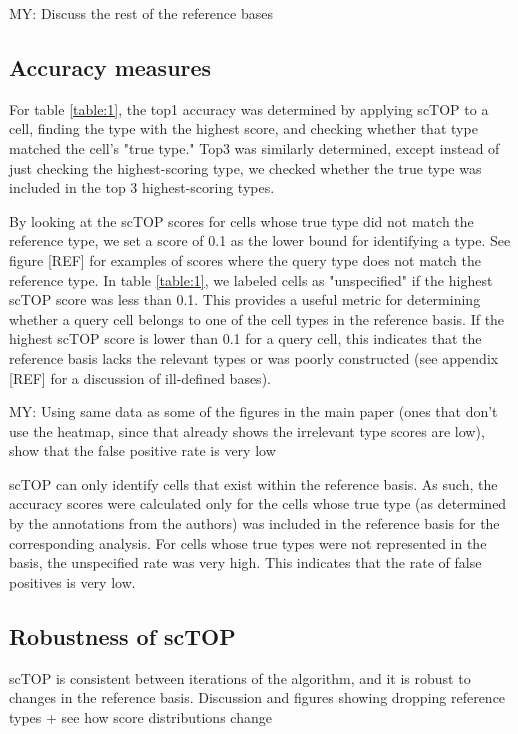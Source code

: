 \documentclass[aps,superscriptaddress, notitlepage,longbibliography]{revtex4-1}
\begin{document}
{\color{red} MY: Discuss the rest of the reference bases} 

\subsection{Accuracy measures}
For table \ref{table:1}, the top1 accuracy was determined by applying scTOP to a cell, finding the type with the highest score, and checking whether that type matched the cell's "true type." Top3 was similarly determined, except instead of just checking the highest-scoring type, we checked whether the true type was included in the top 3 highest-scoring types.

By looking at the scTOP scores for cells whose true type did not match the reference type, we set a score of 0.1 as the lower bound for identifying a type. See figure [REF] for examples of scores where the query type does not match the reference type. In table \ref{table:1}, we labeled cells as "unspecified" if the highest scTOP score was less than 0.1. This provides a useful metric for determining whether a query cell belongs to one of the cell types in the reference basis. If the highest scTOP score is lower than 0.1 for a query cell, this indicates that the reference basis lacks the relevant types or was poorly constructed (see appendix [REF] for a discussion of ill-defined bases). 

{\color{red}MY: Using same data as some of the figures in the main paper (ones that don't use the heatmap, since that already shows the irrelevant type scores are low), show that the false positive rate is very low} 

scTOP can only identify cells that exist within the reference basis. As such, the accuracy scores were calculated only for the cells whose true type (as determined by the annotations from the authors) was included in the reference basis for the corresponding analysis. For cells whose true types were not represented in the basis, the unspecified rate was very high. This indicates that the rate of false positives is very low.

\subsection{Robustness of scTOP}
scTOP is consistent between iterations of the algorithm, and it is robust to changes in the reference basis. {\color{red}Discussion and figures showing dropping reference types + see how score distributions change}
\end{document}
